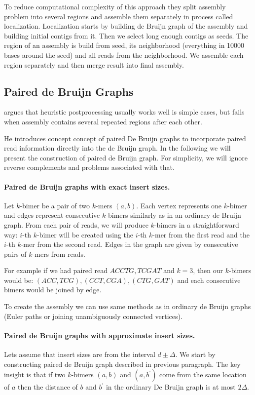 To reduce computational complexity of this approach they split assembly problem
into several regions and assemble them separately in process called localization.
Localization starts by building de Bruijn graph of the assembly and building initial
contigs from it. Then we select long enough contigs as seeds. 
The region of an assembly is build from seed, its neighborhood (everything
in 10000 bases around the seed) and all reads from the neighborhood.
We assemble each region separately and then merge result into final assembly.

\subsection{Paired de Bruijn Graphs}

\citet{Paired} argues that heuristic postprocessing
usually works well is simple cases, but fails when assembly contains
several repeated regions after each other.

He introduces concept concept of paired De Bruijn graphs to incorporate paired read
information directly into the de Bruijn graph.
In the following we will present the construction of 
paired de Bruijn graph.
For simplicity, we will ignore reverse complements and problems associated with that.

\paragraph{Paired de Bruijn graphs with exact insert sizes.}
Let $k$-bimer be a pair of two $k$-mers $(a, b)$. Each vertex 
represents one $k$-bimer and edges represent
consecutive $k$-bimers similarly as in an ordinary de Bruijn graph. 
From each pair of reads, we will produce $k$-bimers in a straightforward way:
$i$-th $k$-bimer will be created using the $i$-th $k$-mer from the first read and 
the $i$-th $k$-mer from the second read.
Edges in the graph are given by consecutive pairs of $k$-mers from reads.

For example if we had paired read $ACCTG, TCGAT$ and $k = 3$, then our
$k$-bimers would be: $(ACC, TCG), (CCT, CGA), (CTG, GAT)$ and each consecutive bimers
would be joined by edge.

To create the assembly we can use same methods as in ordinary de Bruijn graphs
(Euler paths or joining unambiguously connected vertices).

\paragraph{Paired de Bruijn graphs with approximate insert sizes.}
Lets assume that insert sizes are from the interval $d \pm \Delta$.
We start by constructing paired de Bruijn graph described in previous paragraph.
The key insight is that if two $k$-bimers $(a, b)$ and $(a, b^{'})$ come from
the same location of $a$ then the distance of $b$ and $b^{'}$ in the ordinary De Bruijn graph is at
most $2\Delta$.

